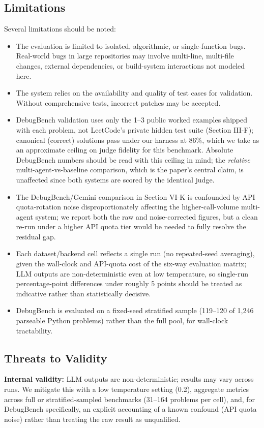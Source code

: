 \documentclass[conference]{IEEEtran}
\begin{document}
\subsection{Limitations}
Several limitations should be noted:
\begin{itemize}
    \item The evaluation is limited to isolated, algorithmic, or single-function bugs. Real-world bugs in large repositories may involve multi-line, multi-file changes, external dependencies, or build-system interactions not modeled here.
    \item The system relies on the availability and quality of test cases for validation. Without comprehensive tests, incorrect patches may be accepted.
    \item DebugBench validation uses only the 1--3 public worked examples shipped with each problem, not LeetCode's private hidden test suite (Section III-F); canonical (correct) solutions pass under our harness at 86\%, which we take as an approximate ceiling on judge fidelity for this benchmark. Absolute DebugBench numbers should be read with this ceiling in mind; the \emph{relative} multi-agent-vs-baseline comparison, which is the paper's central claim, is unaffected since both systems are scored by the identical judge.
    \item The DebugBench/Gemini comparison in Section VI-K is confounded by API quota-rotation noise disproportionately affecting the higher-call-volume multi-agent system; we report both the raw and noise-corrected figures, but a clean re-run under a higher API quota tier would be needed to fully resolve the residual gap.
    \item Each dataset/backend cell reflects a single run (no repeated-seed averaging), given the wall-clock and API-quota cost of the six-way evaluation matrix; LLM outputs are non-deterministic even at low temperature, so single-run percentage-point differences under roughly 5 points should be treated as indicative rather than statistically decisive.
    \item DebugBench is evaluated on a fixed-seed stratified sample (119--120 of 1{,}246 parseable Python problems) rather than the full pool, for wall-clock tractability.
\end{itemize}

\subsection{Threats to Validity}
\textbf{Internal validity:} LLM outputs are non-deterministic; results may vary across runs. We mitigate this with a low temperature setting (0.2), aggregate metrics across full or stratified-sampled benchmarks (31--164 problems per cell), and, for DebugBench specifically, an explicit accounting of a known confound (API quota noise) rather than treating the raw result as unqualified.
\end{document}
